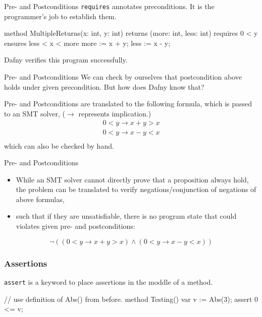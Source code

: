 \documentclass[10pt, compress]{beamer}
\begin{document}
\begin{frame}[fragile]{Pre- and Postconditions}
  \verb|requires| annotates preconditions. It is the programmer's job to establish them.
  \begin{verbnobox}[\footnotesize]
method MultipleReturns(x: int, y: int)
returns (more: int, less: int)
   requires 0 < y
   ensures less < x < more
{
   more := x + y;
   less := x - y;
}

  \end{verbnobox}
  Dafny verifies this program successfully.

\end{frame}

\begin{frame}[fragile]{Pre- and Postconditions}
  We can check by ourselves that postcondition above holds under given precondition. But how does Dafny know that?

  Pre- and Postconditions are translated to the following formula, which is passed to an SMT solver,  ($\to$ represents implication.)
  \begin{align*}
    0 < y \to x + y > x \\
    0 < y \to x - y < x \\
  \end{align*}
  which can also be checked by hand. 
\end{frame}

\begin{frame}[fragile]{Pre- and Postconditions}
  \begin{itemize}
  \item While an SMT solver cannot directly prove that a proposition always hold, the problem can be translated to verify negations/conjunction of negations of above formulas,
   \item such that if they are unsatisfiable, there is no program state that could violates given pre- and postconditions:
  \end{itemize}
    $$\neg((0 < y \to x + y > x) \land (0 < y \to x - y < x))$$
\end{frame}

\begin{frame}[fragile]
  \frametitle{Assertions}
  \verb|assert| is a keyword to place assertions in the moddle of a method.
  \begin{verbnobox}[\footnotesize]
// use definition of Abs() from before.
method Testing()
{
   var v := Abs(3);
   assert 0 <= v;
}
  \end{verbnobox}
\end{frame}
\end{document}
